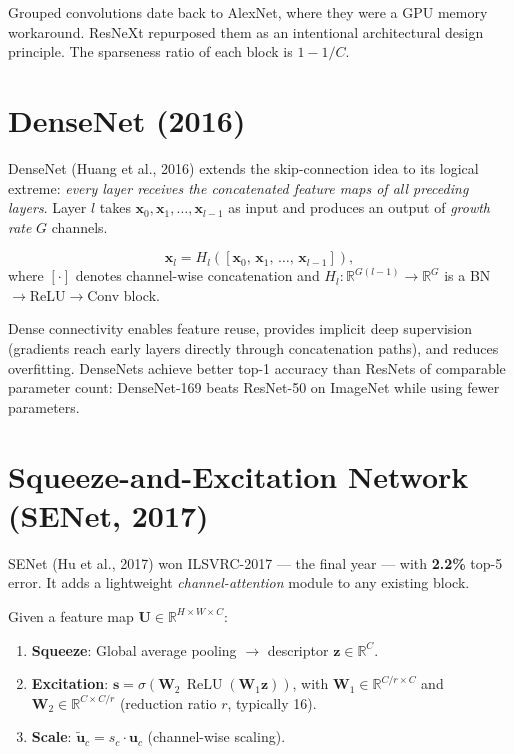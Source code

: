 \documentclass[11pt, oneside]{book}
\newcommand{\R}{\mathbb{R}}
\DeclareMathOperator{\relu}{ReLU}
\begin{document}
Grouped convolutions date back to AlexNet, where they were a GPU memory workaround.
ResNeXt repurposed them as an intentional architectural design principle.
The sparseness ratio of each block is $1 - 1/C$.

\section{DenseNet (2016)}

DenseNet (Huang et al., 2016) extends the skip-connection idea to its logical extreme:
\emph{every layer receives the concatenated feature maps of all preceding layers}.
Layer $l$ takes $\mathbf{x}_0, \mathbf{x}_1, \ldots, \mathbf{x}_{l-1}$ as input
and produces an output of \emph{growth rate} $G$ channels.

\begin{defbox}[title={Dense Block Connectivity}]
\[
  \mathbf{x}_l = H_l\!\left([\mathbf{x}_0,\, \mathbf{x}_1,\, \ldots,\, \mathbf{x}_{l-1}]\right),
\]
where $[\cdot]$ denotes channel-wise concatenation and
$H_l : \R^{G(l-1)} \to \R^G$ is a BN$\to$ReLU$\to$Conv block.
\end{defbox}

Dense connectivity enables feature reuse, provides implicit deep supervision
(gradients reach early layers directly through concatenation paths),
and reduces overfitting.
DenseNets achieve better top-1 accuracy than ResNets of comparable parameter count:
DenseNet-169 beats ResNet-50 on ImageNet while using fewer parameters.

\section{Squeeze-and-Excitation Network (SENet, 2017)}

SENet (Hu et al., 2017) won ILSVRC-2017 — the final year — with \textbf{2.2\%} top-5 error.
It adds a lightweight \emph{channel-attention} module to any existing block.

\begin{defbox}[title={SE Block}]
Given a feature map $\mathbf{U} \in \R^{H \times W \times C}$:
\begin{enumerate}
  \item \textbf{Squeeze}: Global average pooling $\to$ descriptor $\mathbf{z} \in \R^C$.
  \item \textbf{Excitation}: $\mathbf{s} = \sigma\!\left(\mathbf{W}_2\,\relu(\mathbf{W}_1\mathbf{z})\right)$,
        with $\mathbf{W}_1 \in \R^{C/r \times C}$ and $\mathbf{W}_2 \in \R^{C \times C/r}$
        (reduction ratio $r$, typically 16).
  \item \textbf{Scale}: $\widetilde{\mathbf{u}}_c = s_c \cdot \mathbf{u}_c$ (channel-wise scaling).
\end{enumerate}
\end{defbox}
\end{document}
